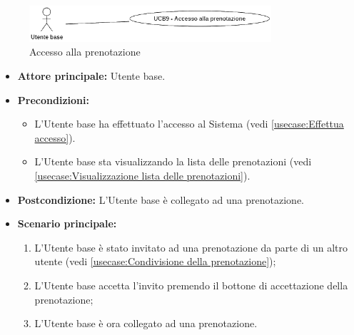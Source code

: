 \newpage
{}
\label{usecase:Accesso alla prenotazione}

\begin{figure}[h]
	\centering
	\includegraphics[width=0.8\textwidth]{./uml/UCB9.png} 
	\caption{Accesso alla prenotazione}
	\label{fig:UCB11}
  \end{figure}

\begin{itemize}
	\item \textbf{Attore principale:} Utente base.

	\item \textbf{Precondizioni:} 
	\begin{itemize}
		\item L'Utente base ha effettuato l'accesso al Sistema (vedi \autoref{usecase:Effettua accesso}).
		\item L'Utente base sta visualizzando la lista delle prenotazioni (vedi \autoref{usecase:Visualizzazione lista delle prenotazioni}).
	\end{itemize}
		

	\item \textbf{Postcondizione:} L'Utente base è collegato ad una prenotazione.

	\item \textbf{Scenario principale:}
	      \begin{enumerate}
		      \item L'Utente base è stato invitato ad una prenotazione da parte di un altro utente (vedi \autoref{usecase:Condivisione della prenotazione});
		      \item L'Utente base accetta l'invito premendo il bottone di accettazione della prenotazione;
		      \item L'Utente base è ora collegato ad una prenotazione.
	      \end{enumerate}
\end{itemize}
